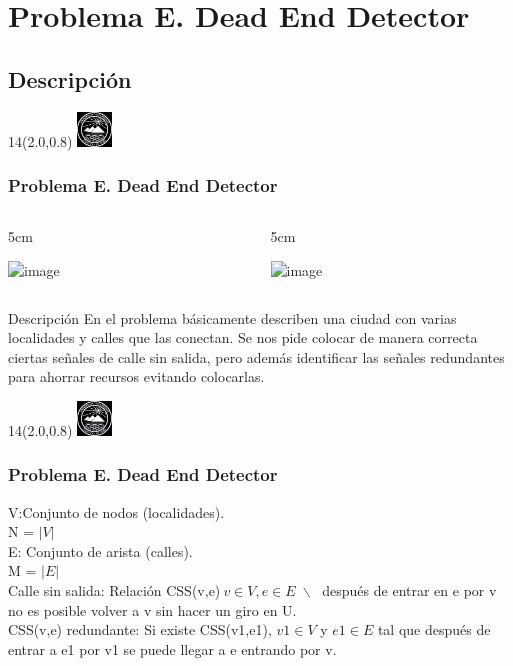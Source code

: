 \documentclass[10pt,xcolor=tables,{dvipsnames}]{beamer}
\newcommand{\MyLogo}{%
	\begin{textblock}{14}(2.0,0.8)
		\includegraphics[height=0.925cm, angle=0]{UOWhite}
	\end{textblock}
}
\begin{document}
\section{Problema E. Dead End Detector}
	\subsection{Descripción}
	\begin{frame}
		\MyLogo
		\frametitle{Problema E. Dead End Detector}
		\begin{columns}
			\begin{column}{5cm}
				\begin{center}
   				\includegraphics<1->[scale=0.36]{Ciudad1}\\
   				\end{center}

			\end{column}
			\begin{column}{5cm}
				\begin{center}
   				\includegraphics<1->[scale=0.8]{DeadEnd}
   				\end{center}
			\end{column}
		\end{columns}
		
		\begin{block}{Descripción}
			\justifying
			En el problema básicamente describen una ciudad con varias localidades y calles que las conectan. Se
			nos pide colocar de manera correcta ciertas señales de calle sin salida, pero además identificar las señales
			redundantes para ahorrar recursos evitando colocarlas.
		\end{block}

	\end{frame}
	\begin{frame}
		\MyLogo
		\frametitle{Problema E. Dead End Detector}
				\begin{block}{}
					V:Conjunto de nodos (localidades).\\
					N = $|V|$\\[0.5cm]
					E: Conjunto de arista (calles).\\
					M = $|E|$\\[0.5cm]
					Calle sin salida: Relación CSS(v,e)$\ v \in V,e \in E \;\backslash\;$ después de entrar en e por v no es posible volver a v sin hacer un giro en U.\\[0.5cm]
					CSS(v,e) redundante: Si existe CSS(v1,e1), $v1 \in V$ y $e1 \in E$ tal que después de entrar a e1 por v1 se puede llegar a e entrando por v.
				\end{block}
				 
	\end{frame}
	
\end{document}
